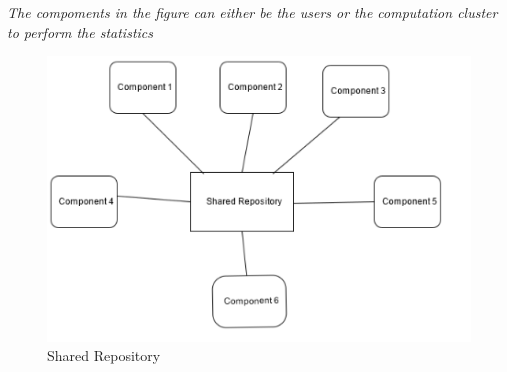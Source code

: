 \begin{description}
\textit{The compoments in the figure can either be the users or the computation cluster to perform the statistics}

\begin{figure}[H]
\centering
\includegraphics[scale=0.7]{4-analysis/images/SharedRepo.png}
\caption{Shared Repository}
\label{fig:unitofworkclass}
\end{figure}


 \end{description}




